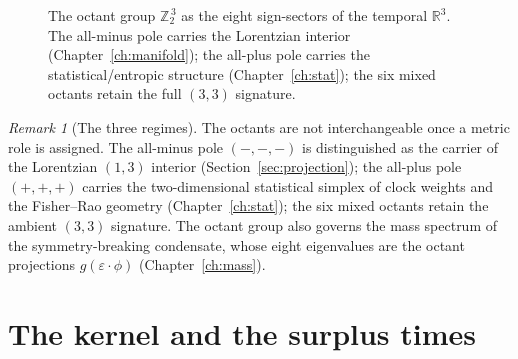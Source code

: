 \documentclass[11pt,oneside]{book}
\newcommand{\Zt}{\mathbb{Z}_2}
\newcommand{\RR}{\mathbb{R}}
\theoremstyle{plain}
\theoremstyle{definition}
\theoremstyle{remark}
\newtheorem{remark}[theorem]{Remark}
\begin{document}
\begin{figure}[t]
\centering
{}
\caption{The octant group $\Zt^{\,3}$ as the eight sign-sectors of the temporal
$\RR^3$. The all-minus pole carries the Lorentzian interior
(Chapter~\ref{ch:manifold}); the all-plus pole carries the statistical/entropic
structure (Chapter~\ref{ch:stat}); the six mixed octants retain the full $(3,3)$
signature.}
\label{fig:octants}
\end{figure}

\begin{remark}[The three regimes]
\label{rem:poles}
The octants are not interchangeable once a metric role is assigned. The all-minus
pole $(-,-,-)$ is distinguished as the carrier of the Lorentzian $(1,3)$ interior
(Section~\ref{sec:projection}); the all-plus pole $(+,+,+)$ carries the
two-dimensional statistical simplex of clock weights and the Fisher--Rao geometry
(Chapter~\ref{ch:stat}); the six mixed octants retain the ambient $(3,3)$
signature. The octant group also governs the mass spectrum of the symmetry-breaking
condensate, whose eight eigenvalues are the octant projections
$g(\varepsilon\!\cdot\!\phi)$ (Chapter~\ref{ch:mass}).
\end{remark}

\section{The kernel and the surplus times}
\label{sec:kernel}
\end{document}
